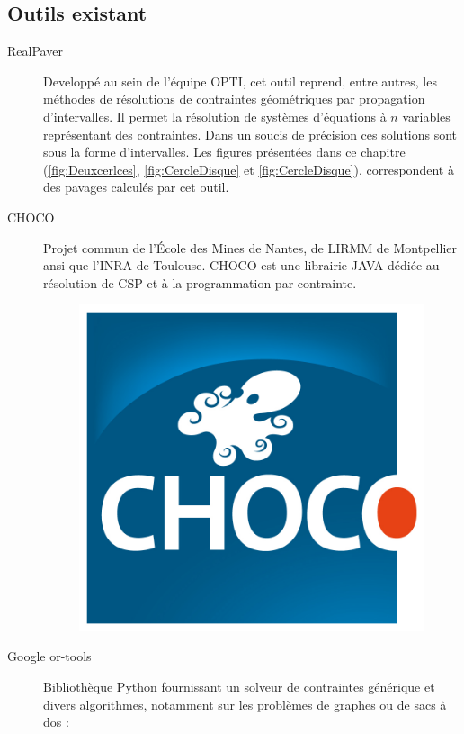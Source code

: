  \subsection{Outils existant}
\begin{description}
 \item [RealPaver]\label{realp}
Developpé  au sein de l'équipe \textsc{OPTI}, cet outil reprend, entre autres, les méthodes de résolutions de contraintes géométriques par propagation d'intervalles. Il permet la résolution de systèmes d'équations à $n$ variables représentant des contraintes. Dans un soucis de précision ces solutions sont sous la forme d'intervalles. Les figures présentées dans ce chapitre (\ref{fig:Deuxcerlces}, \ref{fig:CercleDisque} et \ref{fig:CercleDisque}), correspondent à des pavages calculés par cet outil. \cite{realpaver}
\item [CHOCO]  Projet commun  de l'École des Mines de Nantes, de \textsc{LIRMM} de Montpellier ansi que l'INRA de Toulouse. \textsc{CHOCO} est une librairie  \textsc{JAVA}  dédiée au résolution de \textsc{CSP} et à la programmation par contrainte. \cite{choco}
 \begin{figure}[h] %
  \center
\includegraphics[scale=0.50]{img/choco}
\end{figure} %


\item [Google or-tools]
 Bibliothèque Python fournissant un solveur de contraintes générique et divers algorithmes, notamment sur les problèmes de graphes ou de sacs à dos : \cite{ortools}



\end{description}
